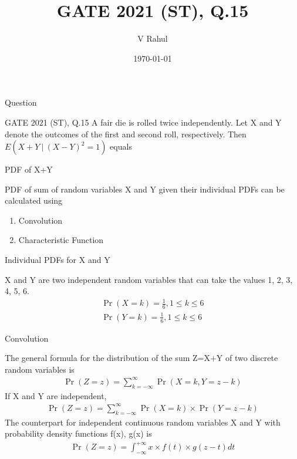 \documentclass{beamer}
\title{GATE 2021 (ST), Q.15}
\author{V Rahul}
\institute{IITH}
\date{\today}
\providecommand{\brak}[1]{\ensuremath{\left(#1\right)}}
\begin{document}
\begin{frame}
    \titlepage
\end{frame}
\begin{frame}{Question}
    \begin{block}{GATE 2021 (ST), Q.15}
        A fair die is rolled twice independently. Let X and Y denote the outcomes of the first and second roll, respectively. Then $E(X+Y\:|\:(X-Y)^2=1)$ equals
    \end{block}
\end{frame}
\begin{frame}{PDF of X+Y}
    \begin{block}{}
        PDF of sum of random variables X and Y given their individual PDFs can be calculated using
        \begin{enumerate}
            \item Convolution
            \item Characteristic Function
        \end{enumerate}
    \end{block}
\end{frame}
\begin{frame}{Individual PDFs for X and Y}
    \begin{block}{}
        X and Y are two independent random variables that can take the values 1, 2, 3, 4, 5, 6.
        \begin{align}
            \Pr\brak{X=k}=\frac{1}{6}, 1\leq k \leq 6\\
            \Pr\brak{Y=k}=\frac{1}{6}, 1\leq k \leq 6
        \end{align}
    \end{block}
\end{frame}
\begin{frame}{Convolution}
    \begin{block}{}
        The general formula for the distribution of the sum Z=X+Y of two discrete random variables is
        \begin{align}
            \Pr\brak{Z=z} = \sum_{k=-\infty}^{\infty} \Pr\brak{X=k,Y=z-k}
        \end{align}
        If X and Y are independent,
        \begin{align}
            \Pr\brak{Z=z} = \sum_{k=-\infty}^{\infty} \Pr\brak{X=k}\times\Pr\brak{Y=z-k}
        \end{align}
        The counterpart for independent continuous random variables X and Y with probability density functions f(x), g(x) is
        \begin{align}
            \Pr\brak{Z=z}=\int_{-\infty}^{+\infty} x\times f(t)\times g(z-t)dt
        \end{align}
    \end{block}
\end{frame}
\end{document}
